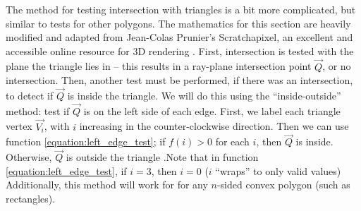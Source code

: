 \documentclass[11pt]{article}
\newcommand{\rayorg}{\vec{R_{origin}}}
\newcommand{\raydir}{\vec{R_{direction}}}
\begin{document}
%
%

The method for testing intersection with triangles is a bit more complicated, but similar to tests for other polygons.
The mathematics for this section are heavily modified and adapted from Jean-Colas Prunier's Scratchapixel, an excellent and accessible online resource for 3D rendering \cite{prunier2017triangle}.
First, intersection is tested with the plane the triangle lies in -- this results in a ray-plane intersection point $\vec{Q}$, or no intersection.
Then, another test must be performed, if there was an intersection, to detect if $\vec{Q}$ is inside the triangle.
We will do this using the ``inside-outside'' method: test if $\vec{Q}$ is on the left side of each edge.
First, we label each triangle vertex $\vec{V_i}$, with $i$ increasing in the counter-clockwise direction.
Then we can use function \ref{equation:left_edge_test}; if $f(i) > 0$ for each $i$, then $\vec{Q}$ is inside.
Otherwise, $\vec{Q}$ is outside the triangle
.Note that in function \ref{equation:left_edge_test}, if $i = 3$, then $i = 0$ ($i$ ``wraps'' to only valid values) Additionally, this method will work for for any $n$-sided convex polygon (such as rectangles).
\end{document}
